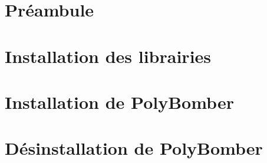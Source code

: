 \section{Préambule}


\section{Installation des librairies}


\section{Installation de PolyBomber}


\section{Désinstallation de PolyBomber}

